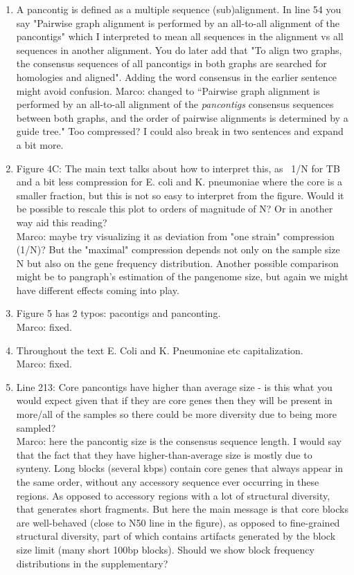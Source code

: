 \documentclass{article}
\newcommand{\Marco}[1]{{\color{gray}Marco: #1}}
\begin{document}
\begin{enumerate}
    \item A pancontig is defined as a multiple sequence (sub)alignment. In line 54 you say "Pairwise graph alignment is performed by an all-to-all alignment of the pancontigs" which I interpreted to mean all sequences in the alignment vs all sequences in another alignment. You do later add that "To align two graphs, the consensus sequences of all pancontigs in both graphs are searched for homologies and aligned". Adding the word consensus in the earlier sentence might avoid confusion.
          \Marco{changed to ``Pairwise graph alignment is performed by an all-to-all alignment of the \emph{pancontigs} consensus sequences between both graphs, and the order of pairwise alignments is determined by a guide tree." Too compressed? I could also break in two sentences and expand a bit more.}

    \item Figure 4C: The main text talks about how to interpret this, as ~1/N for TB and a bit less compression for E. coli and K. pneumoniae where the core is a smaller fraction, but this is not so easy to interpret from the figure. Would it be possible to rescale this plot to orders of magnitude of N? Or in another way aid this reading?\\
          \Marco{maybe try visualizing it as deviation from "one strain" compression (1/N)? But the "maximal" compression depends not only on the sample size N but also on the gene frequency distribution. Another possible comparison might be to pangraph's estimation of the pangenome size, but again we might have different effects coming into play.}

    \item Figure 5 has 2 typos: pacontigs and panconting.\\
          \Marco{fixed.}

    \item Throughout the text E. Coli and K. Pneumoniae etc capitalization.\\
          \Marco{fixed.}

    \item Line 213: Core pancontigs have higher than average size - is this what you would expect given that if they are core genes then they will be present in more/all of the samples so there could be more diversity due to being more sampled?\\
          \Marco{here the pancontig size is the consensus sequence length. I would say that the fact that they have higher-than-average size is mostly due to synteny. Long blocks (several kbps) contain core genes that always appear in the same order, without any accessory sequence ever occurring in these regions. As opposed to accessory regions with a lot of structural diversity, that generates short fragments. But here the main message is that core blocks are well-behaved (close to N50 line in the figure), as opposed to fine-grained structural diversity, part of which contains artifacts generated by the block size limit (many short 100bp blocks). Should we show block frequency distributions in the supplementary?}


\end{enumerate}
\end{document}

